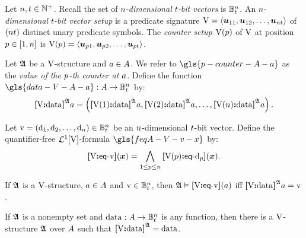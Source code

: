 Let $n, t \in \mathbb{N}^{+}$.
Recall the set of \emph{$n$-dimensional $t$-bit vectors} is
$\mathbb{B}_{t}^{n}$.
An \emph{$n$-dimensional $t$-bit vector setup} is a predicate signature 
$\mathrm{V} = \left\langle \bm{u}_{11}, \bm{u}_{12}, \dots, \bm{u}_{nt} \right\rangle$ of $(nt)$
distinct unary predicate symbols.
The \emph{counter setup $\mathrm{V}(p)$} of $\mathrm{V}$ at position $p \in [1,n]$
is $\mathrm{V}(p) = \left\langle \bm{u}_{p1},\bm{u}_{p2},\dots,\bm{u}_{pt} \right\rangle$.

\begin{definition}
Let $\mathfrak{A}$ be a $\mathrm{V}$-structure and $a \in A$.
We refer to $\gls{p-counter-A-a}$ as the 
\emph{value of the $p$-th counter at $a$}.
Define the function $\gls{data-V-A-a} : \domA \to \ntBitnums\nn\tbit$ by:
\[
  {\bm{[}\mathrm{V}\mathord{\bm{:}}\mathrm{data}\bm{]}}^{\mathfrak{A}}a = \left({\bm{[}\mathrm{V}(1)\mathord{\bm{:}}\mathrm{data}\bm{]}}^{\mathfrak{A}}a, {\bm{[}\mathrm{V}(2)\mathord{\bm{:}}\mathrm{data}\bm{]}}^{\mathfrak{A}}a,
  \dots, {\bm{[}\mathrm{V}(n)\mathord{\bm{:}}\mathrm{data}\bm{]}}^{\mathfrak{A}}a\right).
\]
\end{definition}
\begin{definition}
Let $\mathrm{v} = (\mathrm{d}_1, \mathrm{d}_2, \dots, \mathrm{d}_n) \in \mathbb{B}_{t}^{n}$ be
an $n$-dimensional $t$-bit vector.
Define the quantifier-free $\mathcal{L}^{1}[\mathrm{V}]$-formula $\gls{feqA-V-v-x}$ by:
\[
  {\bm{[}\mathrm{V}\mathord{\bm{:}}\mathsf{eq}{\hbox{-}}\mathrm{v}\bm{]}}(\bm{x}) = \bigwedge_{1 \leq p \leq n}
  {\bm{[}\mathrm{V}(p)\mathord{\bm{:}}\mathsf{eq}{\hbox{-}}\mathrm{d}_p\bm{]}}(\bm{x}).
\]
\end{definition}
If $\mathfrak{A}$ is a $\mathrm{V}$-structure, $a \in A$ and
$\mathrm{v} \in \mathbb{B}_{t}^{n}$, then $\mathfrak{A} \vDash {\bm{[}\mathrm{V}\mathord{\bm{:}}\mathsf{eq}{\hbox{-}}\mathrm{v}\bm{]}}(a)$ iff
${\bm{[}\mathrm{V}\mathord{\bm{:}}\mathrm{data}\bm{]}}^{\mathfrak{A}}a = \mathrm{v}$.

If $\mathfrak{A}$ is a nonempty set and $\operatorname{data} : A \to \mathbb{B}_{t}^{n}$ is any
function, then there is a $\mathrm{V}$-structure $\mathfrak{A}$ over $A$ such that
${\bm{[}\mathrm{V}\mathord{\bm{:}}\mathrm{data}\bm{]}}^{\mathfrak{A}} = \operatorname{data}$.

